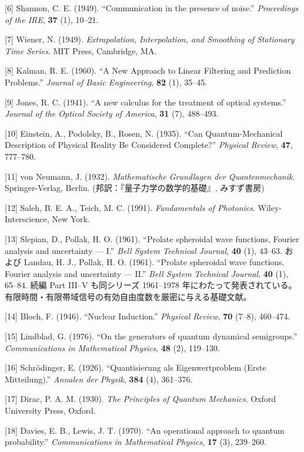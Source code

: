 \documentclass[
]{ltjsarticle}
\begin{document}
{[}6{]} Shannon, C. E. (1949). ``Communication in the presence of
noise.'' \emph{Proceedings of the IRE}, \textbf{37} (1), 10--21.

{[}7{]} Wiener, N. (1949). \emph{Extrapolation, Interpolation, and
Smoothing of Stationary Time Series}. MIT Press, Cambridge, MA.

{[}8{]} Kalman, R. E. (1960). ``A New Approach to Linear Filtering and
Prediction Problems.'' \emph{Journal of Basic Engineering}, \textbf{82}
(1), 35--45.

{[}9{]} Jones, R. C. (1941). ``A new calculus for the treatment of
optical systems.'' \emph{Journal of the Optical Society of America},
\textbf{31} (7), 488--493.

{[}10{]} Einstein, A., Podolsky, B., Rosen, N. (1935). ``Can
Quantum-Mechanical Description of Physical Reality Be Considered
Complete?'' \emph{Physical Review}, \textbf{47}, 777--780.

{[}11{]} von Neumann, J. (1932). \emph{Mathematische Grundlagen der
Quantenmechanik}. Springer-Verlag, Berlin.
(邦訳：『量子力学の数学的基礎』, みすず書房)

{[}12{]} Saleh, B. E. A., Teich, M. C. (1991). \emph{Fundamentals of
Photonics}. Wiley-Interscience, New York.

{[}13{]} Slepian, D., Pollak, H. O. (1961). ``Prolate spheroidal wave
functions, Fourier analysis and uncertainty --- I.'' \emph{Bell System
Technical Journal}, \textbf{40} (1), 43--63. および Landau, H. J.,
Pollak, H. O. (1961). ``Prolate spheroidal wave functions, Fourier
analysis and uncertainty --- II.'' \emph{Bell System Technical Journal},
\textbf{40} (1), 65--84. 続編 Part III--V も同シリーズ 1961--1978
年にわたって発表されている。有限時間・有限帯域信号の有効自由度数を厳密に与える基礎文献。

{[}14{]} Bloch, F. (1946). ``Nuclear Induction.'' \emph{Physical
Review}, \textbf{70} (7--8), 460--474.

{[}15{]} Lindblad, G. (1976). ``On the generators of quantum dynamical
semigroups.'' \emph{Communications in Mathematical Physics}, \textbf{48}
(2), 119--130.

{[}16{]} Schrödinger, E. (1926). ``Quantisierung als Eigenwertproblem
(Erste Mitteilung).'' \emph{Annalen der Physik}, \textbf{384} (4),
361--376.

{[}17{]} Dirac, P. A. M. (1930). \emph{The Principles of Quantum
Mechanics}. Oxford University Press, Oxford.

{[}18{]} Davies, E. B., Lewis, J. T. (1970). ``An operational approach
to quantum probability.'' \emph{Communications in Mathematical Physics},
\textbf{17} (3), 239--260.
\end{document}
